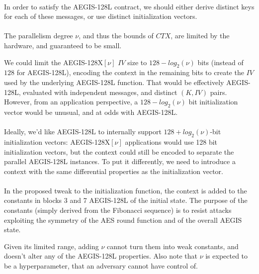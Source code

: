 \documentclass[envcountsame,runningheads,notitlepage]{llncs}
\begin{document}
\paragraph{}

In order to satisfy the AEGIS-128L contract, we should either derive distinct keys for each of these messages, or use distinct initialization vectors.

\paragraph{}

The parallelism degree $\nu$, and thus the bounds of $CTX$, are limited by the hardware, and guaranteed to be small.

We could limit the AEGIS-128X$[\nu]$ $IV$ size to $128-log_2(\nu)$ bits (instead of $128$ for AEGIS-128L), encoding the context in the remaining bits to create the $IV$ used by the underlying AEGIS-128L function.
That would be effectively AEGIS-128L, evaluated with independent messages, and distinct $(K, IV)$ pairs.
However, from an application perspective, a $128-log_2(\nu)$ bit initialization vector would be unusual, and at odds with AEGIS-128L.

\paragraph{}

Ideally, we'd like AEGIS-128L to internally support $128+log_2(\nu)$-bit initialization vectors: AEGIS-128X$[\nu]$ applications would use 128 bit initialization vectors, but the context could still be encoded to separate the parallel AEGIS-128L instances.
To put it differently, we need to introduce a context with the same differential properties as the initialization vector.

\paragraph{}

In the proposed tweak to the initialization function, the context is added to the constants in blocks 3 and 7 AEGIS-128L of the initial state.
The purpose of the constants (simply derived from the Fibonacci sequence) is to resist attacks exploiting the symmetry of the AES round function and of the overall AEGIS state.

Given its limited range, adding $\nu$ cannot turn them into weak constants, and doesn't alter any of the AEGIS-128L properties.
Also note that $\nu$ is expected to be a hyperparameter, that an adversary cannot have control of.
\end{document}
